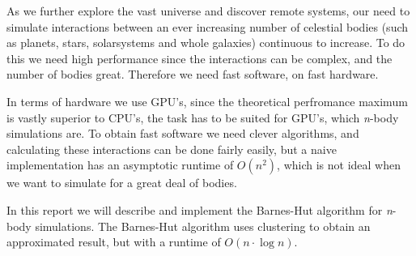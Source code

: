As we further explore the vast universe and discover remote systems, our need to
simulate interactions between an ever increasing number of celestial bodies
(such as planets, stars, solarsystems and whole galaxies) continuous to increase.
To do this we need high performance since the interactions can be complex, and
the number of bodies great. Therefore we need fast software, on fast hardware.

In terms of hardware we use GPU's, since the theoretical perfromance maximum
is vastly superior to CPU's, the task has to be suited for GPU's, which
\textit{n}-body simulations are. To obtain fast software we need clever algorithms,
and calculating these interactions can be done fairly easily, but a naive
implementation has an asymptotic runtime of $O(n^2)$, which is not ideal when we
want to simulate for a great deal of bodies.

In this report we will describe and implement the Barnes-Hut algorithm for
\textit{n}-body simulations. The Barnes-Hut algorithm uses clustering to obtain
an approximated result, but with a runtime of $O(n \cdot \log{n})$.
